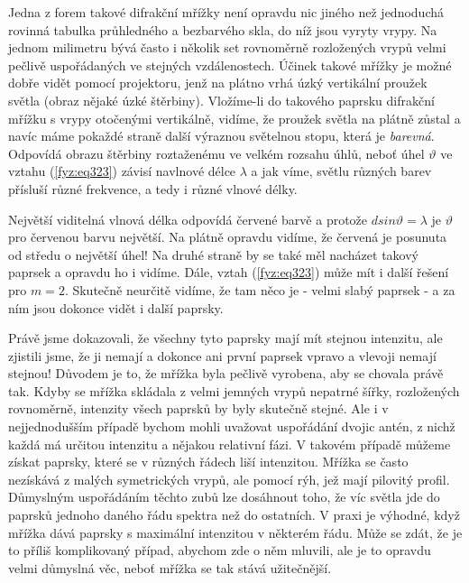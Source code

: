     Jedna z forem takové difrakční mřížky není opravdu nic jiného než jednoduchá rovinná tabulka 
    průhledného a bezbarvého skla, do níž jsou vyryty vrypy. Na jednom milimetru bývá často i 
    několik set rovnoměrně rozložených vrypů velmi pečlivě uspořádaných ve stejných vzdálenostech. 
    Účinek takové mřížky je možné dobře vidět pomocí projektoru, jenž na plátno vrhá úzký 
    vertikální proužek světla (obraz nějaké úzké štěrbiny). Vložíme-li do takového paprsku 
    difrakční mřížku s vrypy otočenými vertikálně, vidíme, že proužek světla na plátně zůstal a 
    navíc máme pokaždé straně další výraznou světelnou stopu, která je \emph{barevná}. Odpovídá 
    obrazu štěrbiny roztaženému ve velkém rozsahu úhlů, neboť úhel \(\vartheta\) ve vztahu 
    (\ref{fyz:eq323}) závisí navlnové délce \(\lambda\) a jak víme, světlu různých barev přísluší 
    různé frekvence, a tedy i různé vlnové délky.
    
    Největší viditelná vlnová délka odpovídá červené barvě a protože \(dsin\vartheta= \lambda\) je 
    \(\vartheta\) pro červenou barvu největší. Na plátně opravdu vidíme, že červená je posunuta od 
    středu o největší úhel! Na druhé straně by se také měl nacházet takový paprsek a opravdu ho i 
    vidíme. Dále, vztah (\ref{fyz:eq323}) může mít i další řešení pro \(m = 2\). Skutečně neurčitě 
    vidíme, že tam něco je - velmi slabý paprsek - a za ním jsou dokonce vidět i další paprsky.
    
    Právě jsme dokazovali, že všechny tyto paprsky mají mít stejnou intenzitu, ale zjistili jsme, 
    že ji nemají a dokonce ani první paprsek vpravo a vlevoji nemají stejnou! Důvodem je to, že 
    mřížka byla pečlivě vyrobena, aby se chovala právě tak. Kdyby se mřížka skládala z velmi 
    jemných vrypů nepatrné šířky, rozložených rovnoměrně, intenzity všech paprsků by byly skutečně 
    stejné. Ale i v nejjednodušším případě bychom mohli uvažovat uspořádání dvojic antén, z nichž 
    každá má určitou intenzitu a nějakou relativní fázi. V takovém případě můžeme získat paprsky, 
    které se v různých řádech liší intenzitou. Mřížka se často nezískává z malých symetrických 
    vrypů, ale pomocí rýh, jež mají pilovitý profil. Důmyslným uspořádáním těchto zubů lze 
    dosáhnout toho, že víc světla jde do paprsků jednoho daného řádu spektra než do ostatních. V 
    praxi je výhodné, když mřížka dává paprsky s maximální intenzitou v některém řádu. Může se 
    zdát, že je to příliš komplikovaný případ, abychom zde o něm mluvili, ale je to opravdu velmi 
    důmyslná věc, neboť mřížka se tak stává užitečnější.
    
